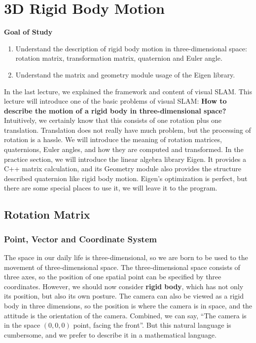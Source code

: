\chapter{3D Rigid Body Motion}

\begin{mdframed}
	\textbf{Goal of Study}
	\begin{enumerate}
		\item Understand the description of rigid body motion in three-dimensional space: rotation matrix, transformation matrix, quaternion and Euler angle.
		\item Understand the matrix and geometry module usage of the Eigen library.
	\end{enumerate}
\end{mdframed}

In the last lecture, we explained the framework and content of visual SLAM. This lecture will introduce one of the basic problems of visual SLAM: \textbf{ How to describe the motion of a rigid body in three-dimensional space?} Intuitively, we certainly know that this consists of one rotation plus one translation. Translation does not really have much problem, but the processing of rotation is a hassle. We will introduce the meaning of rotation matrices, quaternions, Euler angles, and how they are computed and transformed. In the practice section, we will introduce the linear algebra library Eigen. It provides a C++ matrix calculation, and its Geometry module also provides the structure described quaternion like rigid body motion. Eigen's optimization is perfect, but there are some special places to use it, we will leave it to the program.

\section{Rotation Matrix}
\label{sec:3.1}
\subsection{Point, Vector and Coordinate System}
The space in our daily life is three-dimensional, so we are born to be used to the movement of three-dimensional space. The three-dimensional space consists of three axes, so the position of one spatial point can be specified by three coordinates. However, we should now consider \textbf{rigid body}, which has not only its position, but also its own posture. The camera can also be viewed as a rigid body in three dimensions, so the position is where the camera is in space, and the attitude is the orientation of the camera. Combined, we can say, ``The camera is in the space $( 0, 0, 0)$ point, facing the front''. But this natural language is cumbersome, and we prefer to describe it in a mathematical language.

